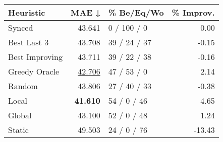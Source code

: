 \begin{tabular}{lrlr}
\toprule
\textbf{Heuristic} & \textbf{MAE ↓} & \textbf{\% Be/Eq/Wo} & \textbf{\% Improv.} \\
\midrule
            Synced &         43.641 &          0 / 100 / 0 &                0.00 \\
\midrule
       Best Last 3 &         43.708 &         39 / 24 / 37 &               -0.15 \\
    Best Improving &         43.711 &         39 / 22 / 38 &               -0.16 \\
\addlinespace
     Greedy Oracle &         \underline{42.706} &          47 / 53 / 0 &                2.14 \\
            Random &         43.806 &         27 / 40 / 33 &               -0.38 \\
\midrule
             Local &         \textbf{41.610} &          54 / 0 / 46 &                4.65 \\
            Global &         43.100 &          52 / 0 / 48 &                1.24 \\
\midrule
            Static &         49.503 &          24 / 0 / 76 &              -13.43 \\
\bottomrule
\end{tabular}

\label{tab:non_lr05_le1_bs2_Summary}
